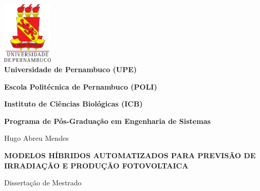 \begin{center}

\includegraphics[height=30mm]{Figuras/Capa/brasao_upe}\\





{\textbf{Universidade de Pernambuco (UPE)}} %

{\textbf{Escola Politécnica de Pernambuco (POLI)}} %

{\textbf{Instituto de Ciências Biológicas (ICB)}} \\ \vspace{1ex}

{\textbf{Programa de Pós-Graduação em Engenharia de Sistemas}} \\ \vspace{1ex}

\vspace{1.0in}

{\Large Hugo Abreu Mendes}

\vspace{1.3in}

{\Large \textbf{MODELOS HÍBRIDOS AUTOMATIZADOS PARA PREVISÃO DE IRRADIAÇÃO E PRODUÇÃO FOTOVOLTAICA}} \\

\vspace{1.4in}

{\large Dissertação de Mestrado}


\vspace{1.6in}


\vspace{18pt}{Recife, Março de 2021.}

\end{center}